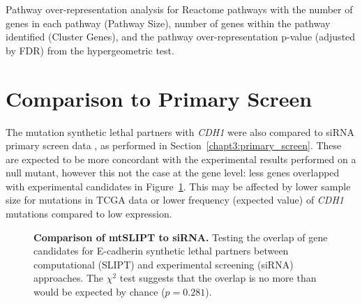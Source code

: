 \begin{table}[!hp]
{\begin{threeparttable}
\begin{tabular}{lccc}
  \hline
\end{tabular}
\begin{tablenotes}
\raggedright %
Pathway over-representation analysis for Reactome pathways with the number of genes in each pathway (Pathway Size), number of genes within the pathway identified (Cluster Genes), and the pathway over-representation p-value (adjusted by \gls{FDR}) from the hypergeometric test.  
\end{tablenotes}
\end{threeparttable}
}
\end{table}


\clearpage
\section{Comparison to Primary Screen}

The mutation synthetic lethal partners with \textit{CDH1} were also compared to \gls{siRNA} primary screen data \citep{Telford2015}, as performed in Section~\ref{chapt3:primary_screen}. These are expected to be more concordant with the experimental results performed on a null mutant, however this not the case at the gene level: less genes overlapped with experimental candidates in Figure~\ref{fig:Venn_allgenes_mtSL}. This may be affected by lower sample size for mutations in \gls{TCGA} data or lower frequency (expected value) of \textit{CDH1} mutations compared to low expression. 

\begin{figure}[!ht]
  \centering
    \caption[Comparison of \acrshort{mtSLIPT} to \gls{siRNA}]{\small \textbf{Comparison of \acrshort{mtSLIPT} to \gls{siRNA}.} Testing the overlap of gene candidates for \gls{E-cadherin} synthetic lethal partners between computational (SLIPT) and experimental screening (siRNA) approaches. The $\chi^2$ test suggests that the overlap is no more than would be expected by chance ($p = 0.281$). %
}
\label{fig:Venn_allgenes_mtSL}
\end{figure}

